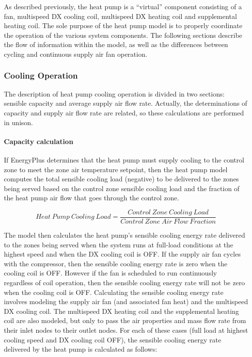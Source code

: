 As described previously, the heat pump is a ``virtual'' component consisting of a fan, multispeed DX cooling coil, multispeed DX heating coil and supplemental heating coil. The sole purpose of the heat pump model is to properly coordinate the operation of the various system components. The following sections describe the flow of information within the model, as well as the differences between cycling and continuous supply air fan operation.

\subsubsection{Cooling Operation}\label{cooling-operation-2}

The description of heat pump cooling operation is divided in two sections: sensible capacity and average supply air flow rate. Actually, the determinations of capacity and supply air flow rate are related, so these calculations are performed in unison.

\paragraph{Capacity calculation}\label{capacity-calculation}

If EnergyPlus determines that the heat pump must supply cooling to the control zone to meet the zone air temperature setpoint, then the heat pump model computes the total sensible cooling load (negative) to be delivered to the zones being served based on the control zone sensible cooling load and the fraction of the heat pump air flow that goes through the control zone.

\begin{equation}
Heat~Pump~Cooling~Load = \frac{{Control~Zone~Cooling~Load}}{{Control~Zone~Air~Flow~Fraction}}
\end{equation}

The model then calculates the heat pump's sensible cooling energy rate delivered to the zones being served when the system runs at full-load conditions at the highest speed and when the DX cooling coil is OFF. If the supply air fan cycles with the compressor, then the sensible cooling energy rate is zero when the cooling coil is OFF. However if the fan is scheduled to run continuously regardless of coil operation, then the sensible cooling energy rate will not be zero when the cooling coil is OFF. Calculating the sensible cooling energy rate involves modeling the supply air fan (and associated fan heat) and the multispeed DX cooling coil. The multispeed DX heating coil and the supplemental heating coil are also modeled, but only to pass the air properties and mass flow rate from their inlet nodes to their outlet nodes. For each of these cases (full load at highest cooling speed and DX cooling coil OFF), the sensible cooling energy rate delivered by the heat pump is calculated as follows:

